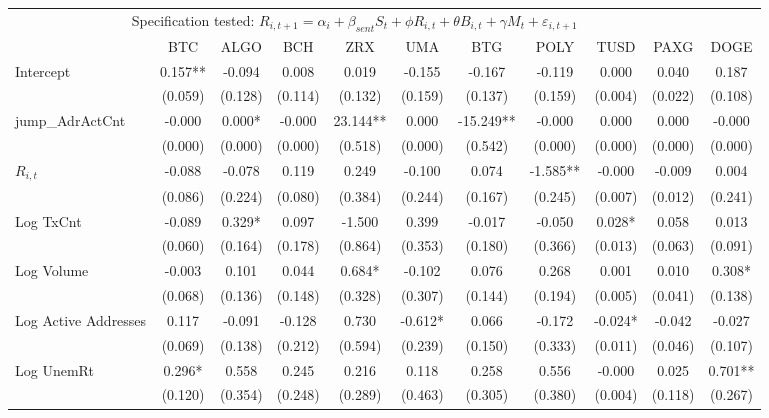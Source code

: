 \begin{table}[ht]
\centering
\scriptsize
\setlength{\tabcolsep}{4pt}
\begin{tabular}{l *{10}{c}}
\toprule
\multicolumn{10}{c}{Specification tested: $R_{i,t+1} = \alpha_i + \beta_{sent} S_t + \phi R_{i,t} + \theta B_{i,t} + \gamma M_t + \varepsilon_{i,t+1}$}\\
\addlinespace
 & BTC & ALGO & BCH & ZRX & UMA & BTG & POLY & TUSD & PAXG & DOGE \\
\midrule
Intercept & 0.157** & -0.094 & 0.008 & 0.019 & -0.155 & -0.167 & -0.119 & 0.000 & 0.040 & 0.187 \\
 & (0.059) & (0.128) & (0.114) & (0.132) & (0.159) & (0.137) & (0.159) & (0.004) & (0.022) & (0.108) \\
\addlinespace
jump_AdrActCnt & -0.000 & 0.000* & -0.000 & 23.144** & 0.000 & -15.249** & -0.000 & 0.000 & 0.000 & -0.000 \\
 & (0.000) & (0.000) & (0.000) & (0.518) & (0.000) & (0.542) & (0.000) & (0.000) & (0.000) & (0.000) \\
\addlinespace
$R_{i,t}$ & -0.088 & -0.078 & 0.119 & 0.249 & -0.100 & 0.074 & -1.585** & -0.000 & -0.009 & 0.004 \\
 & (0.086) & (0.224) & (0.080) & (0.384) & (0.244) & (0.167) & (0.245) & (0.007) & (0.012) & (0.241) \\
\addlinespace
Log TxCnt & -0.089 & 0.329* & 0.097 & -1.500 & 0.399 & -0.017 & -0.050 & 0.028* & 0.058 & 0.013 \\
 & (0.060) & (0.164) & (0.178) & (0.864) & (0.353) & (0.180) & (0.366) & (0.013) & (0.063) & (0.091) \\
\addlinespace
Log Volume & -0.003 & 0.101 & 0.044 & 0.684* & -0.102 & 0.076 & 0.268 & 0.001 & 0.010 & 0.308* \\
 & (0.068) & (0.136) & (0.148) & (0.328) & (0.307) & (0.144) & (0.194) & (0.005) & (0.041) & (0.138) \\
\addlinespace
Log Active Addresses & 0.117 & -0.091 & -0.128 & 0.730 & -0.612* & 0.066 & -0.172 & -0.024* & -0.042 & -0.027 \\
 & (0.069) & (0.138) & (0.212) & (0.594) & (0.239) & (0.150) & (0.333) & (0.011) & (0.046) & (0.107) \\
\addlinespace
Log UnemRt & 0.296* & 0.558 & 0.245 & 0.216 & 0.118 & 0.258 & 0.556 & -0.000 & 0.025 & 0.701** \\
 & (0.120) & (0.354) & (0.248) & (0.289) & (0.463) & (0.305) & (0.380) & (0.004) & (0.118) & (0.267) \\

\end{tabular}
\end{table}
